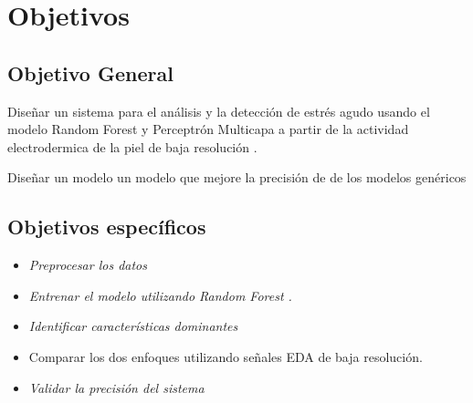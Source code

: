 \section{Objetivos}

\subsection{Objetivo General}

Diseñar   un sistema para el análisis y la detección de estrés agudo  usando el modelo Random Forest y Perceptrón Multicapa  a partir de la actividad electrodermica de la piel de baja resolución .

Diseñar un modelo  un modelo que mejore la precisión de de los modelos genéricos

\subsection{Objetivos específicos}

\textit{
}

\begin{itemize}

  \item \textit{Preprocesar los datos  }


  \item \textit{Entrenar el modelo utilizando  Random Forest .}

  \item \textit{Identificar   características dominantes  }
  \item  Comparar los dos  enfoques  utilizando señales EDA de baja resolución.


  \item \textit{Validar la precisión del sistema }

\end{itemize}







